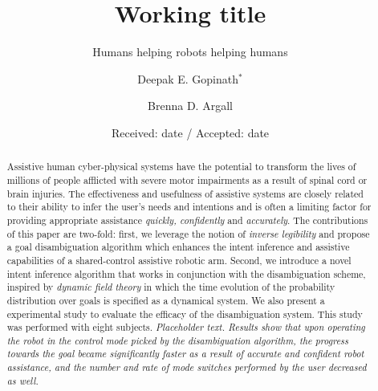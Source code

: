 \title{Working title%
}
\subtitle{Humans helping robots helping humans}


\author{Deepak E. Gopinath$^*$      \and
        Brenna D. Argall %
}



\date{Received: date / Accepted: date}


\maketitle

\begin{abstract}
Assistive human cyber-physical systems have the potential to transform the lives of millions of people afflicted with severe motor impairments as a result of spinal cord or brain injuries. The effectiveness and usefulness of assistive systems are closely related to their ability to infer the user's needs and intentions and is often a limiting factor for providing appropriate assistance \textit{quickly, confidently} and \textit{accurately}. The contributions of this paper are two-fold: first, we leverage the notion of \textit{inverse legibility} and propose a goal disambiguation algorithm which enhances the intent inference and assistive capabilities of a shared-control assistive robotic arm. Second, we introduce a novel intent inference algorithm that works in conjunction with the disambiguation scheme, inspired by \textit{dynamic field theory} in which the time evolution of the probability distribution over goals is specified as a dynamical system. We also present a experimental study to evaluate the efficacy of the disambiguation system. This study was performed with eight subjects. \textit{Placeholder text. Results show that upon operating the robot in the control mode picked by the disambiguation algorithm, the progress towards the goal became significantly faster as a result of accurate and confident robot assistance, and the number and rate of mode switches performed by the user decreased as well.} 
\end{abstract}

